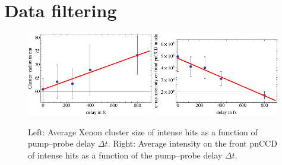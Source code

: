 \section{Data filtering}\label{sec:hitfinding}
\begin{figure}
	\centering
		\includegraphics[width=0.49\textwidth]{images/filter-size.eps}
		\includegraphics[width=0.49\textwidth]{images/filter-sum-frontpnCCD.eps}
	\caption{Left: Average Xenon cluster size of intense hits as a function of pump--probe delay $\Delta t$. Right: Average intensity on the front pnCCD of intense hits as a function of the pump--probe delay $\Delta t$.}
	\label{fig:filter-size-intensity}
\end{figure}
